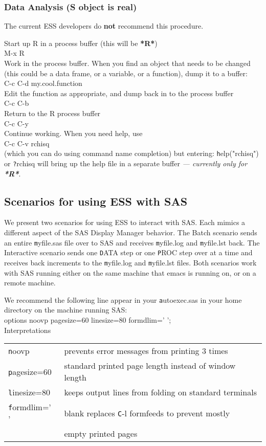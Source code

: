 \documentclass{article}
\newcommand{\elcode}[1]{\\{\texttt\hspace*{2em} #1}\\}
\begin{document}
\subsubsection{Data Analysis (S object is real)}
The current ESS developers do {\bf not} recommend this procedure.

\noindent
Start up R in a process buffer (this will be \textbf{*R*}) 
  \elcode{M-x R}
Work in the process buffer.  When you find an object that needs
to be changed (this could be a data frame, or a variable,
or a function), dump it to a buffer:
  \elcode{C-c C-d my.cool.function}
Edit the function as appropriate, and dump back in to the
process buffer
  \elcode{C-c C-b}
Return to the R process buffer
  \elcode{C-c C-y}
Continue working.
When you need help, use
  \elcode{C-c C-v rchisq}
(which you can do using command name completion)
but entering:   {\texttt help("rchisq")} or {\texttt ?rchisq}
will bring up the help file in a separate buffer
\emph{--- currently only for \textbf{*R*}}.



\subsection{Scenarios for using ESS with SAS}
\label{sec:SAS:scen}

We present two scenarios for using ESS to interact with SAS.  Each
mimics a different aspect of the SAS Display Manager behavior.  The
Batch scenario sends an entire {\texttt myfile.sas} file over to SAS
and receives {\texttt myfile.log} and {\texttt myfile.lst} back.  The
Interactive scenario sends one {\texttt DATA} step or one {\texttt
  PROC} step over at a time and receives back increments to the
{\texttt myfile.log} and {\texttt myfile.lst} files.  Both scenarios
work with SAS running either on the same machine that emacs is running
on, or on a remote machine.

We recommend the following line appear in your {\texttt autoexec.sas}
in your home directory on the machine running SAS: 
\elcode{options noovp pagesize=60 linesize=80 formdlim=' ';}
Interpretations\\
\begin{tabular}{ll}
\texttt   noovp         & prevents error messages from printing 3
                          times         \\ 
\texttt   pagesize=60   & standard printed page length instead of
                          window length \\ 
\texttt   linesize=80   & keeps output lines from folding on standard
                          terminals \\ 
\texttt   formdlim=' '  & blank replaces {\texttt C-l} formfeeds to
                          prevent mostly  \\ 
\texttt                 & empty printed pages                     \\
\end{tabular}\\
\end{document}
